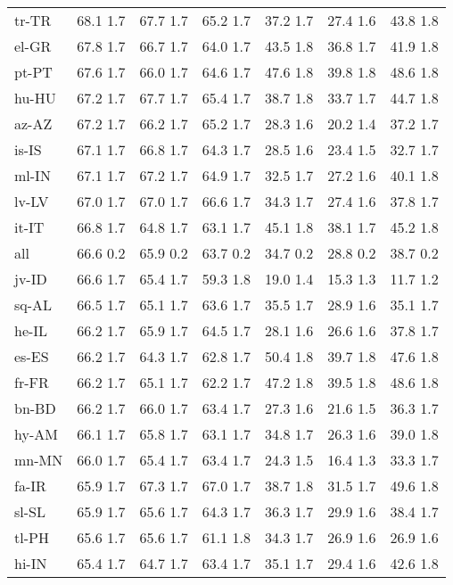 \documentclass[11pt]{article}
\begin{document}
\begin{table*}[]
{\begin{tabular}{lcccccc}
tr-TR & 68.1  1.7 & 67.7  1.7 & 65.2  1.7 & 37.2  1.7 & 27.4  1.6 & 43.8  1.8 \\
el-GR & 67.8  1.7 & 66.7  1.7 & 64.0  1.7 & 43.5  1.8 & 36.8  1.7 & 41.9  1.8 \\
pt-PT & 67.6  1.7 & 66.0  1.7 & 64.6  1.7 & 47.6  1.8 & 39.8  1.8 & 48.6  1.8 \\
hu-HU & 67.2  1.7 & 67.7  1.7 & 65.4  1.7 & 38.7  1.8 & 33.7  1.7 & 44.7  1.8 \\
az-AZ & 67.2  1.7 & 66.2  1.7 & 65.2  1.7 & 28.3  1.6 & 20.2  1.4 & 37.2  1.7 \\
is-IS & 67.1  1.7 & 66.8  1.7 & 64.3  1.7 & 28.5  1.6 & 23.4  1.5 & 32.7  1.7 \\
ml-IN & 67.1  1.7 & 67.2  1.7 & 64.9  1.7 & 32.5  1.7 & 27.2  1.6 & 40.1  1.8 \\
lv-LV & 67.0  1.7 & 67.0  1.7 & 66.6  1.7 & 34.3  1.7 & 27.4  1.6 & 37.8  1.7 \\
it-IT & 66.8  1.7 & 64.8  1.7 & 63.1  1.7 & 45.1  1.8 & 38.1  1.7 & 45.2  1.8 \\
all & 66.6  0.2 & 65.9  0.2 & 63.7  0.2 & 34.7  0.2 & 28.8  0.2 & 38.7  0.2 \\
jv-ID & 66.6  1.7 & 65.4  1.7 & 59.3  1.8 & 19.0  1.4 & 15.3  1.3 & 11.7  1.2 \\
sq-AL & 66.5  1.7 & 65.1  1.7 & 63.6  1.7 & 35.5  1.7 & 28.9  1.6 & 35.1  1.7 \\
he-IL & 66.2  1.7 & 65.9  1.7 & 64.5  1.7 & 28.1  1.6 & 26.6  1.6 & 37.8  1.7 \\
es-ES & 66.2  1.7 & 64.3  1.7 & 62.8  1.7 & 50.4  1.8 & 39.7  1.8 & 47.6  1.8 \\
fr-FR & 66.2  1.7 & 65.1  1.7 & 62.2  1.7 & 47.2  1.8 & 39.5  1.8 & 48.6  1.8 \\
bn-BD & 66.2  1.7 & 66.0  1.7 & 63.4  1.7 & 27.3  1.6 & 21.6  1.5 & 36.3  1.7 \\
hy-AM & 66.1  1.7 & 65.8  1.7 & 63.1  1.7 & 34.8  1.7 & 26.3  1.6 & 39.0  1.8 \\
mn-MN & 66.0  1.7 & 65.4  1.7 & 63.4  1.7 & 24.3  1.5 & 16.4  1.3 & 33.3  1.7 \\
fa-IR & 65.9  1.7 & 67.3  1.7 & 67.0  1.7 & 38.7  1.8 & 31.5  1.7 & 49.6  1.8 \\
sl-SL & 65.9  1.7 & 65.6  1.7 & 64.3  1.7 & 36.3  1.7 & 29.9  1.6 & 38.4  1.7 \\
tl-PH & 65.6  1.7 & 65.6  1.7 & 61.1  1.8 & 34.3  1.7 & 26.9  1.6 & 26.9  1.6 \\
hi-IN & 65.4  1.7 & 64.7  1.7 & 63.4  1.7 & 35.1  1.7 & 29.4  1.6 & 42.6  1.8 \\

\end{tabular}}
\end{table*}
\end{document}
